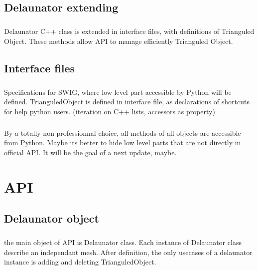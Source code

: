 \documentclass{report}
\begin{document}
\section{Delaunator extending}
    \paragraph*{}
    Delaunator C++ class is extended in interface files, with definitions of Trianguled Object. 
    These methods allow API to manage efficiently Trianguled Object.


\section{Interface files}
    \paragraph*{}
    Specifications for SWIG, where low level part accessible by Python will be defined.
    TrianguledObject is defined in interface file, as declarations of shortcuts for help python users. (iteration on C++ lists, accessors as property)
    \paragraph*{}
    By a totally non-professionnal choice, all methods of all objects are accessible from Python.
    Maybe its better to hide low level parts that are not directly in official API. It will be the goal of a next update, maybe.
    





\chapter{API}
\section{Delaunator object}
    \paragraph*{}
    the main object of API is Delaunator class. Each instance of Delaunator class describe an independant mesh.
    After definition, the only usecases of a delaunator instance is adding and deleting TrianguledObject.
    \paragraph*{}
\end{document}
